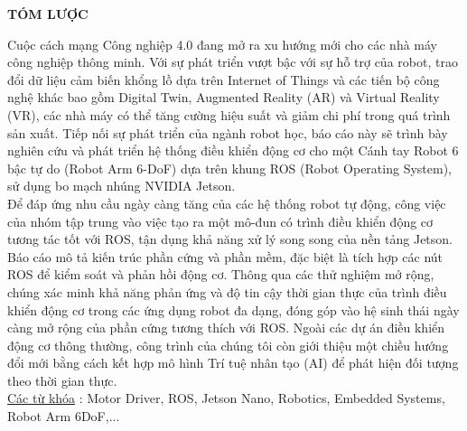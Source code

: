\begin{center}
    \textbf{TÓM LƯỢC}
\end{center}


Cuộc cách mạng Công nghiệp 4.0 đang mở ra xu hướng mới cho các nhà máy công nghiệp thông minh. Với sự phát triển vượt bậc với sự hỗ trợ của robot, trao đổi dữ liệu cảm biến khổng lồ dựa trên Internet of Things và các tiến bộ công nghệ khác bao gồm Digital Twin, Augmented Reality (AR) và Virtual Reality (VR), các nhà máy có thể tăng cường hiệu suất và giảm chi phí trong quá trình sản xuất. Tiếp nối sự phát triển của ngành robot học, báo cáo này sẽ trình bày nghiên cứu và phát triển hệ thống điều khiển động cơ cho một Cánh tay Robot 6 bậc tự do (Robot Arm 6-DoF) dựa trên khung ROS (Robot Operating System), sử dụng bo mạch nhúng NVIDIA Jetson.\\ 

Để đáp ứng nhu cầu ngày càng tăng của các hệ thống robot tự động, công việc của nhóm tập trung vào việc tạo ra một mô-đun có trình điều khiển động cơ tương tác tốt với ROS, tận dụng khả năng xử lý song song của nền tảng Jetson. Báo cáo mô tả kiến trúc phần cứng và  phần mềm, đặc biệt là tích hợp các nút ROS để kiểm soát và phản hồi động cơ. Thông qua các thử nghiệm mở rộng, chúng  xác minh khả năng phản ứng và độ tin cậy thời gian thực của trình điều khiển động cơ trong các ứng dụng robot đa dạng, đóng góp vào hệ sinh thái ngày càng mở rộng của phần cứng tương thích với ROS. Ngoài các dự án điều khiển động cơ thông thường, công trình của chúng tôi còn giới thiệu một chiều hướng đổi mới bằng cách kết hợp mô hình Trí tuệ nhân tạo (AI) để phát hiện đối tượng theo thời gian thực.\\

\underline{Các từ khóa} : Motor Driver, ROS, Jetson Nano, Robotics, Embedded Systems, Robot Arm 6DoF,...

